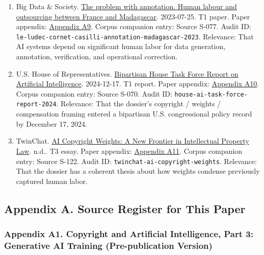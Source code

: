 \documentclass[
  american,
  11pt,
  letterpaper,
]{article}
\begin{document}
\begin{enumerate}
  federal court outside the Anthropic case treated training-stage
  copying and dataset assembly as central issues serious enough to
  survive dismissal.
\item
  Big Data \& Society.
  \href{https://journals.sagepub.com/doi/10.1177/20539517231188723}{The
  problem with annotation. Human labour and outsourcing between France
  and Madagascar}. 2023-07-25. T1 paper. Paper appendix:
  \hyperref[ch-04-appendix-a9-the-problem-with-annotation-human-labour-and-outsourcing-between-france-and-madagascar]{Appendix
  A9}. Corpus companion entry: Source S-077. Audit ID:
  \texttt{le-ludec-cornet-casilli-annotation-madagascar-2023}.
  Relevance: That AI systems depend on significant human labor for data
  generation, annotation, verification, and operational correction.
\item
  U.S. House of Representatives.
  \href{https://www.speaker.gov/wp-content/uploads/2024/12/AI-Task-Force-Report-FINAL.pdf}{Bipartisan
  House Task Force Report on Artificial Intelligence}. 2024-12-17. T1
  report. Paper appendix:
  \hyperref[ch-04-appendix-a10-bipartisan-house-task-force-report-on-artificial-intelligence]{Appendix
  A10}. Corpus companion entry: Source S-070. Audit ID:
  \texttt{house-ai-task-force-report-2024}. Relevance: That the
  dossier's copyright / weights / compensation framing entered a
  bipartisan U.S. congressional policy record by December 17, 2024.
\item
  TwinChat.
  \href{https://medium.com/twinchat/ai-copyright-weights-a-new-frontier-in-intellectual-property-law-d8ee1b6c55ee}{AI
  Copyright Weights: A New Frontier in Intellectual Property Law}. n.d..
  T3 essay. Paper appendix:
  \hyperref[ch-04-appendix-a11-ai-copyright-weights-a-new-frontier-in-intellectual-property-law]{Appendix
  A11}. Corpus companion entry: Source S-122. Audit ID:
  \texttt{twinchat-ai-copyright-weights}. Relevance: That the dossier
  has a coherent thesis about how weights condense previously captured
  human labor.
\end{enumerate}

\subsection{Appendix A. Source Register for This
Paper}\label{appendix-a.-source-register-for-this-paper-4}

\subsubsection{Appendix A1. Copyright and Artificial Intelligence, Part
3: Generative AI Training (Pre-publication
Version)}\label{ch-04-appendix-a1-copyright-and-artificial-intelligence-part-3-generative-ai-training-pre-publication-version}
\end{document}

